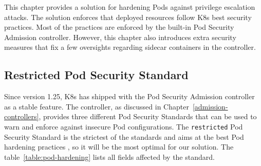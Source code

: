 \documentclass[english, 12pt, a4paper, sci, utf8, a-2b, online]{aaltothesis}
\begin{document}
This chapter provides a solution for hardening Pods against privilege escalation attacks. The solution enforces that deployed resources follow K8s best security practices. Most of the practices are enforced by the built-in Pod Security Admission controller. However, this chapter also introduces extra security measures that fix a few oversights regarding sidecar containers in the controller.


\subsection{Restricted Pod Security Standard}

Since version 1.25, K8s has shipped with the Pod Security Admission controller as a stable feature. The controller, as discussed in Chapter~\ref{admission-controllers}, provides three different Pod Security Standards that can be used to warn and enforce against insecure Pod configurations. The \texttt{restricted} Pod Security Standard is the strictest of the standards and aims at the best Pod hardening practices \cite{k8s-docs-pss}, so it will be the most optimal for our solution. The table~\ref{table:pod-hardening} lists all fields affected by the standard.
\end{document}
